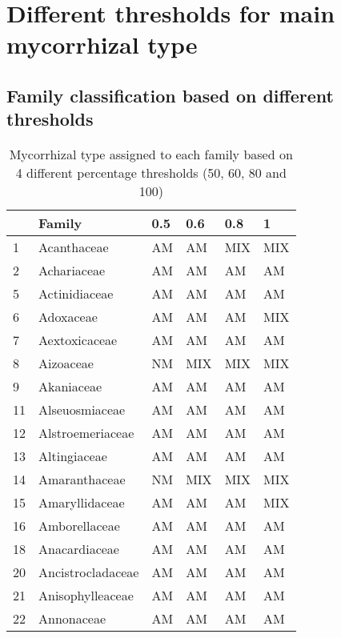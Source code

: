 \documentclass[]{article}
\begin{document}
\hypertarget{different-thresholds-for-main-mycorrhizal-type}{%
\section{Different thresholds for main mycorrhizal
type}\label{different-thresholds-for-main-mycorrhizal-type}}

\hypertarget{family-classification-based-on-different-thresholds}{%
\subsection{Family classification based on different
thresholds}\label{family-classification-based-on-different-thresholds}}

\begin{longtable}{l|l|l|l|l|l}
\caption{\label{tab:unnamed-chunk-5}Mycorrhizal type assigned to each family based on 4 different percentage thresholds (50, 60, 80 and 100)}\\
\hline
  & Family & 0.5 & 0.6 & 0.8 & 1\\
\hline
1 & Acanthaceae & AM & AM & MIX & MIX\\
\hline
2 & Achariaceae & AM & AM & AM & AM\\
\hline
5 & Actinidiaceae & AM & AM & AM & AM\\
\hline
6 & Adoxaceae & AM & AM & AM & MIX\\
\hline
7 & Aextoxicaceae & AM & AM & AM & AM\\
\hline
8 & Aizoaceae & NM & MIX & MIX & MIX\\
\hline
9 & Akaniaceae & AM & AM & AM & AM\\
\hline
11 & Alseuosmiaceae & AM & AM & AM & AM\\
\hline
12 & Alstroemeriaceae & AM & AM & AM & AM\\
\hline
13 & Altingiaceae & AM & AM & AM & AM\\
\hline
14 & Amaranthaceae & NM & MIX & MIX & MIX\\
\hline
15 & Amaryllidaceae & AM & AM & AM & MIX\\
\hline
16 & Amborellaceae & AM & AM & AM & AM\\
\hline
18 & Anacardiaceae & AM & AM & AM & AM\\
\hline
20 & Ancistrocladaceae & AM & AM & AM & AM\\
\hline
21 & Anisophylleaceae & AM & AM & AM & AM\\
\hline
22 & Annonaceae & AM & AM & AM & AM\\
\hline

\end{longtable}
\end{document}
